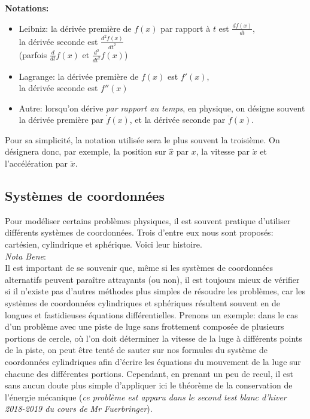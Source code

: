 \documentclass{article}
\numberwithin{equation}{section}
\begin{document}
\textbf{Notations:}
\begin{itemize}
	\item Leibniz: la dérivée première de \(f(x)\) par rapport à \(t\) est \(\frac{df(x)}{dt}\), \\
		la dérivée seconde est \(\frac{d^2f(x)}{dt^2}\) \\
		(parfois \(\frac{d}{dt}f(x)\) et \(\frac{d^2}{dt^2}f(x)\))
	\item Lagrange: la dérivée première de \(f(x)\) est \(f'(x)\), \\
		la dérivée seconde est \(f''(x)\)
	\item Autre: lorsqu'on dérive \emph{par rapport au temps}, en physique, on désigne souvent la dérivée première par \(\dot f(x)\), et la dérivée seconde par \(\ddot f(x)\).
\end{itemize}

Pour sa simplicité, la notation utilisée sera le plus souvent la troisième. On désignera donc, par exemple, la position sur \(\hat x\) par \(x\), la vitesse par \(\dot x\) et l'accélération par \(\ddot x\).

\subsection{Systèmes de coordonnées}
Pour modéliser certains problèmes physiques, il est souvent pratique d'utiliser différents systèmes de coordonnées. Trois d'entre eux nous sont proposés: cartésien, cylindrique et sphérique. Voici leur histoire. \\

\emph{Nota Bene}: \\
Il est important de se souvenir que, même si les systèmes de coordonnées alternatifs peuvent paraître attrayants (ou non), il est toujours mieux de vérifier si il n'existe pas d'autres méthodes plus simples de résoudre les problèmes, car les systèmes de coordonnées cylindriques et sphériques résultent souvent en de longues et fastidieuses équations différentielles. Prenons un exemple: dans le cas d'un problème avec une piste de luge sans frottement composée de plusieurs portions de cercle, où l'on doit déterminer la vitesse de la luge à différents points de la piste, on peut être tenté de sauter sur nos formules du système de coordonnées cylindriques afin d'écrire les équations du mouvement de la luge sur chacune des différentes portions. Cependant, en prenant un peu de recul, il est sans aucun doute plus simple d'appliquer ici le théorème de la conservation de l'énergie mécanique (\textit{ce problème est apparu dans le second test blanc d'hiver 2018-2019 du cours de Mr Fuerbringer}).
\end{document}
